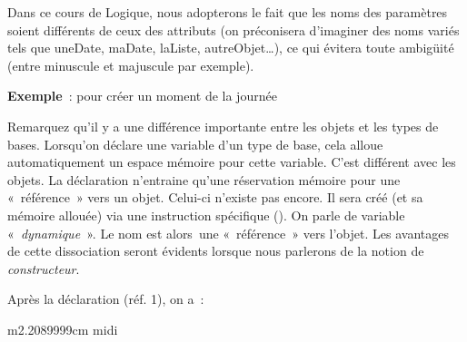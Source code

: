 
Dans ce cours de Logique, nous adopterons le fait que 
les noms des paramètres soient différents de ceux des 
attributs (on préconisera d’imaginer des noms variés tels 
que uneDate, maDate, laListe, autreObjet…), ce qui évitera 
toute ambigüité (entre minuscule et majuscule par exemple).


{
\textbf{Exemple}~: pour créer un moment de la journée}


Remarquez qu'il y a une différence importante entre les
objets et les types de bases. Lorsqu'on déclare une
variable d'un type de base, cela alloue
automatiquement un espace mémoire pour cette variable.
C'est différent avec les objets. La déclaration
n'entraine qu'une réservation mémoire
pour une «~référence~» vers un objet. Celui-ci
n'existe pas encore. Il sera créé (et sa mémoire
allouée) via une instruction spécifique (). On
parle de variable «\textit{~dynamique~}». Le nom est alors~une
«~référence~» vers l’objet. Les avantages de cette dissociation seront
évidents lorsque nous parlerons de la notion de \textit{constructeur}.

\clearpage

Après la déclaration (réf. 1), on a~:

\begin{center}
\tablehead{}
\begin{supertabular}{m{2.2089999cm}}
\centering\arraybslash  midi\\\hline
{}\\\hline
\end{supertabular}
\end{center}

